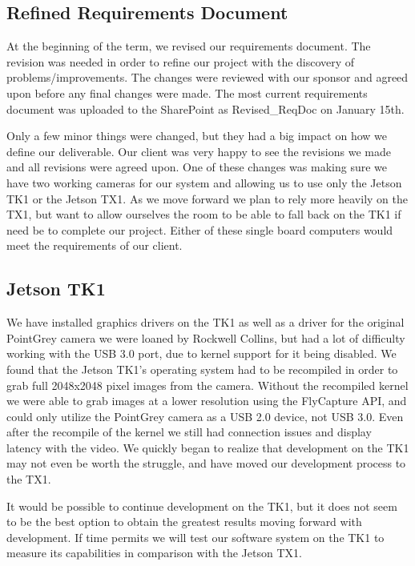 \documentclass[letterpaper,10pt,titlepage]{IEEEtran}
\begin{document}
   \subsection{Refined Requirements Document}
   At the beginning of the term, we revised our requirements document. The revision was needed in order to refine our project with the discovery of problems/improvements. The changes were reviewed with our sponsor and agreed upon before any final changes were made. The most current requirements document was uploaded to the SharePoint as Revised\_ReqDoc on January 15th.\\ 
\par
Only a few minor things were changed, but they had a big impact on how we define our deliverable. Our client was very happy to see the revisions we made and all revisions were agreed upon. One of these changes was making sure we have two working cameras for our system and allowing us to use only the Jetson TK1 or the Jetson TX1. As we move forward we plan to rely more heavily on the TX1, but want to allow ourselves the room to be able to fall back on the TK1 if need be to complete our project. Either of these single board computers would meet the requirements of our client.
   
   \subsection{Jetson TK1}
   We have installed graphics drivers on the TK1 as well as a driver for the original PointGrey camera we were loaned by Rockwell Collins, but had a lot of difficulty working with the USB 3.0 port, due to kernel support for it being disabled. We found that the Jetson TK1's operating system had to be recompiled in order to grab full 2048x2048 pixel images from the camera. Without the recompiled kernel we were able to grab images at a lower resolution using the FlyCapture API, and could only utilize the PointGrey camera as a USB 2.0 device, not USB 3.0. Even after the recompile of the kernel we still had connection issues and display latency with the video. We quickly began to realize that development on the TK1 may not even be worth the struggle, and have moved our development process to the TX1.\\ 
\par
It would be possible to continue development on the TK1, but it does not seem to be the best option to obtain the greatest results moving forward with development. If time permits we will test our software system on the TK1 to measure its capabilities in comparison with the Jetson TX1.
   
\end{document}
